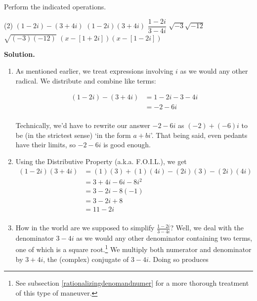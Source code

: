 \begin{ex} \label{complexzeroex1} Perform the indicated operations.
\label{complexnumberarithmetic}

\begin{tasks}(2)
\task  $(1-2i) - (3+4i)$ 
\task  $(1-2i)(3+4i)$ 
\task  $\dfrac{1-2i}{3-4i}$
\task  $\sqrt{-3} \sqrt{-12}$
\task  $\sqrt{(-3)(-12)}$
\task  $(x-[1+2i])(x-[1-2i])$
\end{tasks}

{\bf Solution.} 

\begin{enumerate}

\item  As mentioned earlier, we treat expressions involving $i$ as we would any other radical. We distribute and combine like terms:

\begin{align*}
(1-2i) - (3+4i) & = 1-2i-3-4i \tag{Distribute} \\
& = -2 - 6i \tag{Gather like terms} \\
\end{align*}

Technically, we'd have to rewrite our answer  $-2-6i$ as $(-2) + (-6)i$ to be (in the strictest sense) `in the form $a+bi$'. That being said, even pedants have their limits, so $-2-6i$ is good enough.

\item  Using the Distributive Property (a.k.a. F.O.I.L.), we get
\begin{align*}
 (1-2i)(3+4i)  & = (1)(3) + (1)(4i) - (2i)(3) - (2i)(4i) \tag{F.O.I.L.} \\
& = 3+4i-6i-8i^2 \\			
& = 3 - 2i - 8(-1) \tag{$i^2=-1$} \\
& = 3 - 2i + 8 \\
& = 11 - 2i \\ 
\end{align*}

\item  How in the world are we supposed to simplify $\frac{1-2i}{3-4i}$?  Well, we deal with the denominator $3-4i$ as we would any other denominator containing two terms, one of which is a square root.\footnote{See subsection \ref{rationalizingdenomandnumer} for a more thorough treatment of this type of maneuver.} We multiply both numerator and denominator by $3+4i$, the (complex) conjugate of $3 - 4i$.  Doing so produces


\end{enumerate}
\end{ex}
